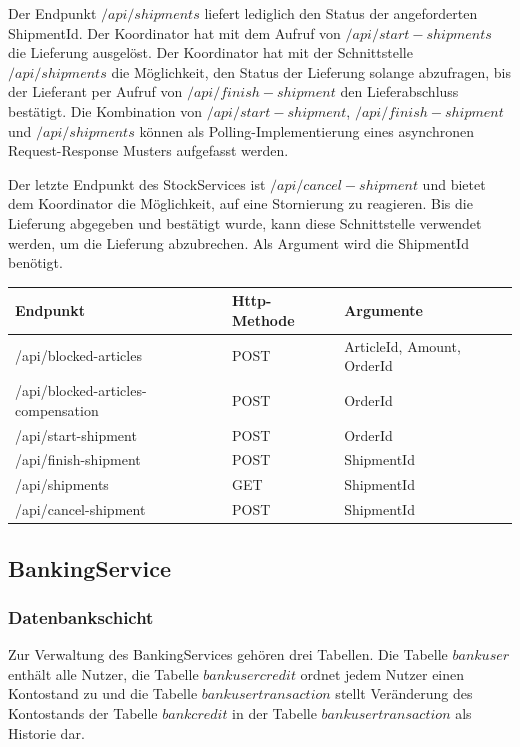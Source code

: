 Der Endpunkt $/api/shipments$ liefert lediglich den Status der angeforderten ShipmentId. Der Koordinator hat mit dem Aufruf von $/api/start-shipments$ die Lieferung ausgelöst. Der Koordinator hat mit der Schnittstelle $/api/shipments$ die Möglichkeit, den Status der Lieferung solange abzufragen, bis der Lieferant per Aufruf von $/api/finish-shipment$ den Lieferabschluss bestätigt. Die Kombination von $/api/start-shipment$, $/api/finish-shipment$ und $/api/shipments$ können als Polling-Implementierung eines asynchronen Request-Response Musters aufgefasst werden. 

Der letzte Endpunkt des StockServices ist $/api/cancel-shipment$ und bietet dem Koordinator die Möglichkeit, auf eine Stornierung zu reagieren. Bis die Lieferung abgegeben und bestätigt wurde, kann diese Schnittstelle verwendet werden, um die Lieferung abzubrechen. Als Argument wird die ShipmentId benötigt.

\begin{center}
	\begin{tabular}[h]{|p{6.5cm}|p{3cm}|p{5.1cm}|}
		\hline
		Endpunkt & Http-Methode & Argumente \\ \hline
		/api/blocked-articles & POST & ArticleId, Amount, OrderId\\ \hline
		/api/blocked-articles-compensation & POST & OrderId \\ \hline
		/api/start-shipment & POST & OrderId \\ \hline
		/api/finish-shipment & POST & ShipmentId \\ \hline
		/api/shipments & GET & ShipmentId \\ \hline
		/api/cancel-shipment & POST & ShipmentId \\ \hline
	\end{tabular}
\end{center}
\FloatBarrier

\subsection{BankingService}
\subsubsection{Datenbankschicht} %
Zur Verwaltung des BankingServices gehören drei Tabellen. Die Tabelle $bankuser$ enthält alle Nutzer, die Tabelle $bankusercredit$ ordnet jedem Nutzer einen Kontostand zu und die Tabelle $bankusertransaction$ stellt Veränderung des Kontostands der Tabelle $bankcredit$ in der Tabelle $bankusertransaction$ als Historie dar.


